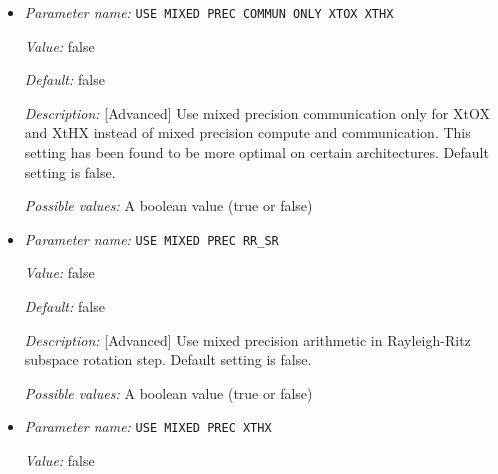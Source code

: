 \begin{itemize}
{\it Default:} false


{\it Description:} [Advanced] Use mixed precision arithmetic in subspace rotation step of CGS orthogonalization, if ORTHOGONALIZATION TYPE is set to CGS. Default setting is false.


{\it Possible values:} A boolean value (true or false)
\item {\it Parameter name:} {\tt USE MIXED PREC COMMUN ONLY XTOX XTHX}
\label{parameters:SCF parameters/Eigen_2dsolver parameters/USE MIXED PREC COMMUN ONLY XTOX XTHX}
\label{parameters:SCF_20parameters/Eigen_2dsolver_20parameters/USE_20MIXED_20PREC_20COMMUN_20ONLY_20XTOX_20XTHX}


{\it Value:} false


{\it Default:} false


{\it Description:} [Advanced] Use mixed precision communication only for XtOX and XtHX instead of mixed precision compute and communication. This setting has been found to be more optimal on certain architectures. Default setting is false.


{\it Possible values:} A boolean value (true or false)
\item {\it Parameter name:} {\tt USE MIXED PREC RR\_SR}
\label{parameters:SCF parameters/Eigen_2dsolver parameters/USE MIXED PREC RR_5fSR}
\label{parameters:SCF_20parameters/Eigen_2dsolver_20parameters/USE_20MIXED_20PREC_20RR_5fSR}


{\it Value:} false


{\it Default:} false


{\it Description:} [Advanced] Use mixed precision arithmetic in Rayleigh-Ritz subspace rotation step. Default setting is false.


{\it Possible values:} A boolean value (true or false)
\item {\it Parameter name:} {\tt USE MIXED PREC XTHX}
\label{parameters:SCF parameters/Eigen_2dsolver parameters/USE MIXED PREC XTHX}
\label{parameters:SCF_20parameters/Eigen_2dsolver_20parameters/USE_20MIXED_20PREC_20XTHX}


{\it Value:} false



\end{itemize}
